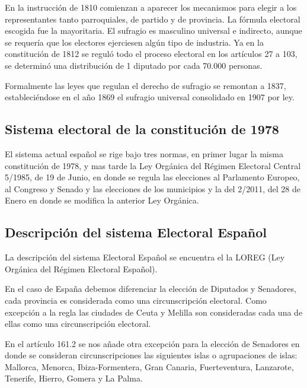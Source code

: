 \documentclass[12pt,a4paper,]{book}
\numberwithin{dummy}{section}
\theoremstyle{ocrenumbox}
\theoremstyle{blacknumex}
\theoremstyle{blacknumbox}
\theoremstyle{ocrenum}
\theoremstyle{ocrenum}
\begin{document}
En la instrucción de 1810 comienzan a aparecer los mecanismos para
elegir a los representantes tanto parroquiales, de partido y de
provincia. La fórmula electoral escogida fue la mayoritaria. El sufragio
es masculino universal e indirecto, aunque se requería que los electores
ejerciesen algún tipo de industria. Ya en la constitución de 1812 se
reguló todo el proceso electoral en los artículos 27 a 103, se determinó
una distribución de 1 diputado por cada 70.000 personas.

Formalmente las leyes que regulan el derecho de sufragio se remontan a
1837, estableciéndose en el año 1869 el sufragio universal consolidado
en 1907 por ley.

\hypertarget{sistema-electoral-de-la-constituciuxf3n-de-1978}{%
\subsection{Sistema electoral de la constitución de
1978}\label{sistema-electoral-de-la-constituciuxf3n-de-1978}}

El sistema actual español se rige bajo tres normas, en primer lugar la
misma constitución de 1978, y mas tarde la Ley Orgánica del Régimen
Electoral Central 5/1985, de 19 de Junio, en donde se regula las
elecciones al Parlamento Europeo, al Congreso y Senado y las elecciones
de los municipios y la del 2/2011, del 28 de Enero en donde se modifica
la anterior Ley Orgánica.

\hypertarget{descripciuxf3n-del-sistema-electoral-espauxf1ol}{%
\subsection{Descripción del sistema Electoral
Español}\label{descripciuxf3n-del-sistema-electoral-espauxf1ol}}

La descripción del sistema Electoral Español se encuentra el la LOREG
(Ley Orgánica del Régimen Electoral Español).

En el caso de España debemos diferenciar la elección de Diputados y
Senadores, cada provincia es considerada como una circunscripción
electoral. Como excepción a la regla las ciudades de Ceuta y Melilla son
consideradas cada una de ellas como una circunscripción electoral.

En el artículo 161.2 se nos añade otra excepción para la elección de
Senadores en donde se consideran circunscripciones las siguientes islas
o agrupaciones de islas: Mallorca, Menorca, Ibiza-Formentera, Gran
Canaria, Fuerteventura, Lanzarote, Tenerife, Hierro, Gomera y La Palma.
\end{document}
